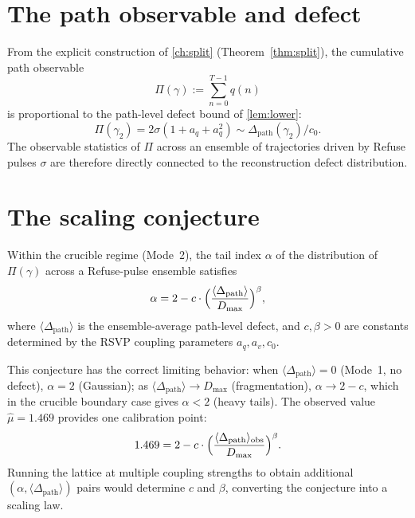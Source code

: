 \documentclass[12pt, oneside]{memoir}
\newcommand{\Dpth}{\Delta_{\mathrm{path}}}
\newcommand{\aq}{a_q}
\newcommand{\av}{a_v}
\begin{document}
\section{The path observable and defect}

From the explicit construction of \cref{ch:split} (Theorem~\ref{thm:split}), the
cumulative path observable
\[
  \Pi(\gamma) := \sum_{n=0}^{T-1} q(n)
\]
is proportional to the path-level defect bound of \cref{lem:lower}:
\[
  \Pi(\gamma_2) = 2\sigma(1 + \aq + \aq^2) \sim \Dpth(\gamma_2) / c_0.
\]
The observable statistics of $\Pi$ across an ensemble of trajectories driven by Refuse
pulses $\sigma$ are therefore directly connected to the reconstruction defect
distribution.

\section{The scaling conjecture}

\begin{conjecture}
\label{conj:tail}
Within the crucible regime (Mode~2), the tail index $\alpha$ of the distribution of
$\Pi(\gamma)$ across a Refuse-pulse ensemble satisfies
\begin{equation}\label{eq:tail-conj}
  \alpha = 2 - c \cdot \Bigl(\frac{\langle\Dpth\rangle}{D_{\max}}\Bigr)^\beta,
\end{equation}
where $\langle\Dpth\rangle$ is the ensemble-average path-level defect, and $c, \beta > 0$
are constants determined by the RSVP coupling parameters $\aq, \av, c_0$.
\end{conjecture}

\begin{remark}
This conjecture has the correct limiting behavior: when $\langle\Dpth\rangle = 0$ (Mode~1,
no defect), $\alpha = 2$ (Gaussian); as $\langle\Dpth\rangle \to D_{\max}$ (fragmentation),
$\alpha \to 2 - c$, which in the crucible boundary case gives $\alpha < 2$ (heavy tails).
The observed value $\hat\mu = 1.469$ provides one calibration point:
\[
  1.469 = 2 - c\cdot\Bigl(\frac{\langle\Dpth\rangle_{\mathrm{obs}}}{D_{\max}}\Bigr)^\beta.
\]
Running the lattice at multiple coupling strengths to obtain additional $(\alpha,
\langle\Dpth\rangle)$ pairs would determine $c$ and $\beta$, converting the conjecture
into a scaling law.
\end{remark}
\end{document}
